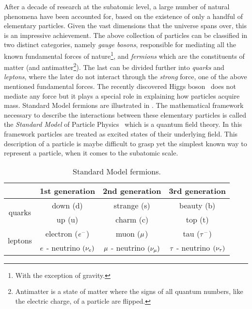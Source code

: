 After a decade of research at the subatomic level, a large number of natural phenomena have been accounted
for, based on the existence of only a handful of elementary particles. Given the vast dimensions that the
universe spans over, this is an impressive achievement. The above collection of particles can be classified
in two distinct categories, namely {\it gauge bosons}, responsible for mediating all the known fundamental
forces of nature\footnote{With the exception of gravity.}, and {\it fermions} which are the constituents
of matter
(and antimatter\footnote{Antimatter is a state of matter where the signs of all quantum numbers, like the electric charge, of a particle are flipped.}).
The last can be divided further into {\it quarks} and {\it leptons}, where the later do not interact through
the {\it strong} force, one of the above mentioned fundamental forces. The recently discovered Higgs
boson~\cite{higgs-cms,higgs-atlas} does not mediate any force but it plays a special role in explaining how
particles acquire mass. Standard Model fermions are illustrated in .
The mathematical framework necessary to describe the interactions between these elementary particles is called
the \textit{Standard Model} of Particle Physics~\cite{sm-glashow,sm-weinberg,sm-salam} which is a quantum field theory.
In this framework particles are treated as excited states of their underlying field. This description of a
particle is maybe difficult to grasp yet the simplest known way to represent a particle, when it comes to the subatomic scale.


\begin{table}[h!]
  \centering
 \begin{tabular}{cccc}
   \hline
                            &  1st generation                     &   2nd generation              &  3rd generation    \\
   \hline
   \multirow{2}{*}{quarks}  &  down (d)                           &   strange (s)                 &  beauty (b)        \\
                            &  up (u)                             &   charm (c)                   &  top (t)           \\
   \hline
   \multirow{2}{*}{leptons} &   electron ($e^-$)                  &   muon ($\mu$)               &  tau ($\tau^-$)     \\
                            &   $e$ - neutrino $(\nu_e)$  &  $\mu$ - neutrino $(\nu_\mu)$  &  $\tau$ - neutrino $(\nu_\tau)$  \\
   \hline
 \end{tabular}
 \caption{Standard Model fermions.}
 \label{quarksLeptons}
\end{table}

